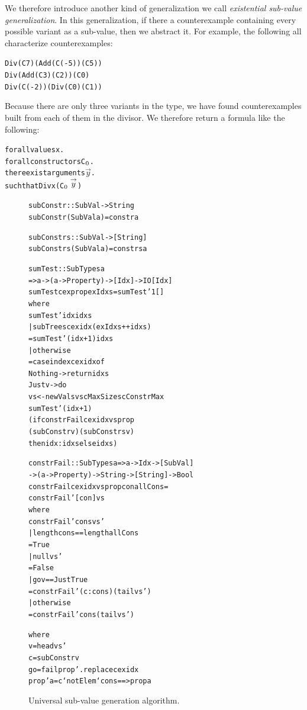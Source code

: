 \documentclass[10pt]{sigplanconf}
\newenvironment{code}{\begin{alltt}\small}{\end{alltt}}
\begin{document}
We therefore introduce another kind of generalization we call \emph{existential
  sub-value generalization}.  In this generalization, if there a counterexample
containing every possible variant as a sub-value, then we abstract it.  For
example, the following all characterize counterexamples:
%
\begin{code}
Div (C 7) (Add (C (-5)) (C 5))
Div (Add (C 3) (C 2)) (C 0)
Div (C (-2)) (Div (C 0) (C 1))
\end{code}
%
\noindent
Because there are only three variants in the type, we have found counterexamples
built from each of them in the divisor.  We therefore return a formula like the
following:
%
\begin{code}
forall values x .
  forall constructors C\(\sb{0}\) .
    there exist arguments \(\stackrel{\rightarrow}{y}\) .
      such that Div x (C\(\sb{0} \stackrel{\rightarrow}{y}\))
\end{code}
%

\begin{figure}
  \begin{code}
subConstr :: SubVal -> String
subConstr (SubVal a) = constr a

subConstrs :: SubVal -> [String]
subConstrs (SubVal a) = constrs a

sumTest :: SubTypes a
          => a -> (a -> Property) -> [Idx] -> IO [Idx]
sumTest cex prop exIdxs = sumTest' 1 []
  where
  sumTest' idx idxs
    | subTrees cex idx (exIdxs ++ idxs)
    = sumTest' (idx+1) idxs
    | otherwise
    = case index cex idx of
        Nothing -> return idxs
        Just v  -> do
          vs <- newVals v scMaxSize scConstrMax
          sumTest' (idx+1)
            (if constrFail cex idx vs prop
                  (subConstr v) (subConstrs v)
               then idx:idxs else idxs)

constrFail :: SubTypes a => a -> Idx -> [SubVal]
  -> (a -> Property) -> String -> [String] -> Bool
constrFail cex idx vs prop con allCons =
  constrFail' [con] vs
  where
  constrFail' cons vs'
    | length cons == length allCons
    = True
    | null vs'
    = False
    | go v == Just True
    = constrFail' (c:cons) (tail vs')
    | otherwise
    = constrFail' cons (tail vs')

    where
    v  = head vs'
    c  = subConstr v
    go = fail prop' . replace cex idx
    prop' a = c `notElem` cons ==> prop a
  \end{code}
  \caption{Universal sub-value generation algorithm.}
  \label{fig:constrs}
\end{figure}
\end{document}
